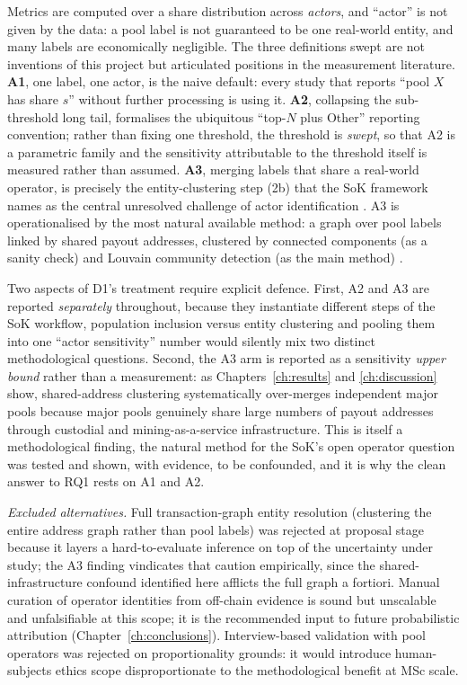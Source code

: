 \documentclass[logo,msc]{infthesis}           %
\begin{document}
Metrics are computed over a share distribution across \emph{actors}, and
``actor'' is not given by the data: a pool label is not guaranteed to be one
real-world entity, and many labels are economically negligible. The three
definitions swept are not inventions of this project but articulated positions
in the measurement literature. \textbf{A1}, one label, one actor, is the
naive default: every study that reports ``pool $X$ has share $s$'' without
further processing is using it. \textbf{A2}, collapsing the sub-threshold
long tail, formalises the ubiquitous ``top-$N$ plus Other'' reporting
convention; rather than fixing one threshold, the threshold is \emph{swept}, so
that A2 is a parametric family and the sensitivity attributable to the
threshold itself is measured rather than assumed. \textbf{A3}, merging
labels that share a real-world operator, is precisely the entity-clustering
step (2b) that the SoK framework names as the central unresolved challenge of
actor identification \cite{ovezik2025sok}. A3 is operationalised by the most
natural available method: a graph over pool labels linked by shared payout
addresses, clustered by connected components (as a sanity check) and Louvain
community detection (as the main method) \cite{blondel2008louvain}.
 
Two aspects of D1's treatment require explicit defence. First, A2 and A3 are
reported \emph{separately} throughout, because they instantiate different
steps of the SoK workflow, population inclusion versus entity clustering
and pooling them into one ``actor sensitivity'' number would silently mix
two distinct methodological questions. Second, the A3 arm is reported as a
sensitivity \emph{upper bound} rather than a measurement: as
Chapters~\ref{ch:results} and \ref{ch:discussion} show, shared-address
clustering systematically over-merges independent major pools because major
pools genuinely share large numbers of payout addresses through custodial and
mining-as-a-service infrastructure. This is itself a methodological finding,
the natural method for the SoK's open operator question was tested and
shown, with evidence, to be confounded, and it is why the clean answer to
RQ1 rests on A1 and A2.
 
\emph{Excluded alternatives.} Full transaction-graph entity resolution
(clustering the entire address graph rather than pool labels) was rejected at
proposal stage because it layers a hard-to-evaluate inference on top of the
uncertainty under study; the A3 finding vindicates that caution empirically,
since the shared-infrastructure confound identified here afflicts the full
graph a fortiori. Manual curation of operator identities from off-chain
evidence is sound but unscalable and unfalsifiable at this scope; it is the
recommended input to future probabilistic attribution
(Chapter~\ref{ch:conclusions}). Interview-based validation with pool operators
was rejected on proportionality grounds: it would introduce human-subjects
ethics scope disproportionate to the methodological benefit at MSc scale.
 
\end{document}
